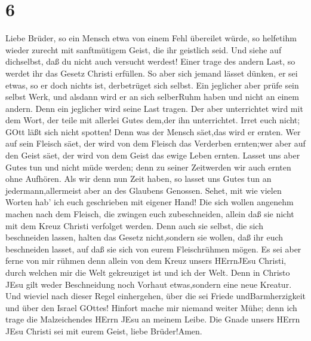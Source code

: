 \hypertarget{section-4}{%
\section{6}\label{section-4}}

 Liebe Brüder, so ein Mensch etwa von einem Fehl übereilet
würde, so helfetihm wieder zurecht mit sanftmütigem Geist, die ihr
geistlich seid. Und siehe auf dichselbst, daß du nicht auch versucht
werdest!  Einer trage des andern Last, so werdet ihr das
Gesetz Christi erfüllen.  So aber sich jemand lässet dünken,
er sei etwas, so er doch nichts ist, derbetrüget sich selbst.
 Ein jeglicher aber prüfe sein selbst Werk, und alsdann wird
er an sich selberRuhm haben und nicht an einem andern.  Denn
ein jeglicher wird seine Last tragen.  Der aber unterrichtet
wird mit dem Wort, der teile mit allerlei Gutes dem,der ihn
unterrichtet.  Irret euch nicht; GOtt läßt sich nicht
spotten! Denn was der Mensch säet,das wird er ernten.  Wer
auf sein Fleisch säet, der wird von dem Fleisch das Verderben ernten;wer
aber auf den Geist säet, der wird von dem Geist das ewige Leben ernten.
 Lasset uns aber Gutes tun und nicht müde werden; denn zu
seiner Zeitwerden wir auch ernten ohne Aufhören.  Als wir
denn nun Zeit haben, so lasset uns Gutes tun an jedermann,allermeist
aber an des Glaubens Genossen.  Sehet, mit wie vielen
Worten hab' ich euch geschrieben mit eigener Hand!  Die
sich wollen angenehm machen nach dem Fleisch, die zwingen euch
zubeschneiden, allein daß sie nicht mit dem Kreuz Christi verfolget
werden.  Denn auch sie selbst, die sich beschneiden lassen,
halten das Gesetz nicht,sondern sie wollen, daß ihr euch beschneiden
lasset, auf daß sie sich von eurem Fleischrühmen mögen.  Es
sei aber ferne von mir rühmen denn allein von dem Kreuz unsers HErrnJEsu
Christi, durch welchen mir die Welt gekreuziget ist und ich der Welt.
 Denn in Christo JEsu gilt weder Beschneidung noch Vorhaut
etwas,sondern eine neue Kreatur.  Und wieviel nach dieser
Regel einhergehen, über die sei Friede undBarmherzigkeit und über den
Israel GOttes!  Hinfort mache mir niemand weiter Mühe; denn
ich trage die Malzeichendes HErrn JEsu an meinem Leibe. 
Die Gnade unsers HErrn JEsu Christi sei mit eurem Geist, liebe
Brüder!Amen.
